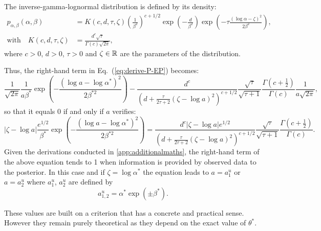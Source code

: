     The inverse-gamma-lognormal distribution is defined by its density:
    \begin{align}
        p_{\alpha,\beta}(\alpha,\beta) &= K(c,d,\tau,\zeta)\left(\frac{1}{\beta^2}\right)^{c+1/2}\exp\left(-\frac{d}{\beta^2}\right)\exp\left(-\tau\frac{(\log\alpha-\zeta)^2}{2\beta^2}\right),\nonumber\\
        \text{with}\quad K(c,d,\tau,\zeta) &=\frac{d^c\sqrt{\tau}}{\Gamma(c)\sqrt{2\pi}},
    \end{align}
    where $c>0$, $d>0$, $\tau>0$ and $\zeta\in\mathbb{R}$ are the parameters of the distribution. %
    
    Thus, the right-hand term in  Eq.~(\ref{eq:derive-P-EP}) becomes:
    \begin{equation}
        \frac{1}{\sqrt{2\pi}}\frac{1}{a\beta^\ast}\exp\left(-\frac{(\log a-\log\alpha^\ast)^2}{2\beta^{\ast2}}\right) - \frac{d^c}{(d+\frac{\tau}{2\tau+2}(\zeta-\log a)^2)^{c+1/2}}\frac{\sqrt{\tau}}{\sqrt{\tau+1}}\frac{\Gamma(c+\frac{1}{2})}{\Gamma(c)}\frac{1}{a\sqrt{2\pi}},
    \end{equation}
    so that it equals $0$ if and only if $a$ verifies:
    \begin{equation}\label{eq:equality-au}
        |\zeta-\log a|\frac{e^{1/2}}{\beta^\ast}\exp\left(-\frac{(\log a-\log\alpha^\ast)^2}{2\beta^{\ast2}}\right) = \frac{d^c|\zeta-\log a|e^{1/2} }{(d+\frac{\tau}{2\tau+2}(\zeta-\log a)^2)^{c+1/2}}\frac{\sqrt{\tau}}{\sqrt{\tau+1}}\frac{\Gamma(c+\frac{1}{2})}{\Gamma(c)}.
    \end{equation}
    Given the derivations conducted in \ref{app:additionalmaths}, the right-hand term of the above equation tends to 1 when information is provided by observed data to the posterior. In this case and if $\zeta=\log\alpha^\ast$  the equation leads to $a=a^u_1$ or $a=a^u_2$ where $a^u_1$, $a^u_2$ are defined by
        \begin{equation}
            a^u_{1,2} = \alpha^\ast\exp\left(\pm\beta^\ast\right).
        \end{equation}
    
    These values are built on a criterion that has a concrete and practical sense. However they remain purely theoretical as they depend on the exact value of $\theta^\ast$.
    
